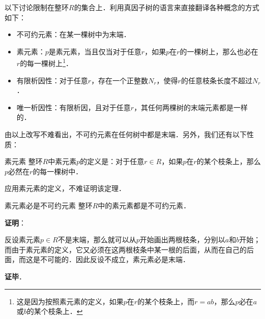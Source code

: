 以下讨论限制在整环$R$的集合上．利用真因子树的语言来直接翻译各种概念的方式如下：

\begin{itemize}
\item 不可约元素：在某一棵树中为末端．
\item 素元素：$p$是素元素，当且仅当对于任意$r$，如果$p$在$r$的一棵树上，那么也必在$r$的每一棵树上\footnote{这是因为按照素元素的定义，如果$p$在$r$的某个枝条上，而$r=ab$，那么$p$必在$a$或$b$的某个枝条上．}．
\item 有限析因性：对于任意$r$，存在一个正整数$N_r$，使得$r$的任意枝条长度不超过$N_r$．
\item 唯一析因性：有限析因，且对于任意$r$，其任何两棵树的末端元素都是一样的．
\end{itemize}

由以上改写不难看出，不可约元素在任何树中都是末端．另外，我们还有以下性质：

\begin{theorem}{素元素}
整环$R$中素元素$p$的定义是：对于任意$r\in R$，如果$p$在$r$的某个枝条上，那么$p$必然在$r$的每一棵树中．
\end{theorem}

应用素元素的定义，不难证明该定理．


\begin{theorem}{素元素必是不可约元素}
整环$R$中的素元素都是不可约元素．
\end{theorem}

\textbf{证明}：

反设素元素$p\in R$不是末端，那么就可以从$p$开始画出两根枝条，分别以$a$和$b$开始；而由于素元素的定义，它又必须在这两根枝条中某一根的后面，从而在自己的后面，而这是不可能的．因此反设不成立，素元素必是末端．

\textbf{证毕}．


